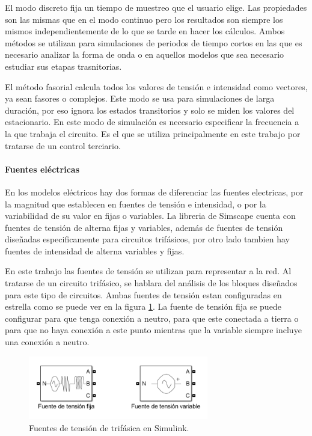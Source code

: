 \documentclass{book}
\begin{document}
El modo discreto fija un tiempo de muestreo que el usuario elige. Las propiedades son las mismas que en el modo continuo pero los resultados son siempre los mismos independientemente de lo que se tarde en hacer los c\'alculos. Ambos m\'etodos se utilizan para simulaciones de periodos de tiempo cortos en las que es necesario analizar la forma de onda o en aquellos modelos que sea necesario estudiar sus etapas trasnitorias. \par

El m\'etodo fasorial calcula todos los valores de tensi\'on e intensidad como vectores, ya sean fasores o complejos. Este modo se usa para simulaciones de larga duraci\'on, por eso ignora los estados transitorios y solo se miden los valores del estacionario. En este modo de simulaci\'on es necesario especificar la frecuencia a la que trabaja el circuito. Es el que se utiliza principalmente en este trabajo por tratarse de un control terciario. \par

		\paragraph {Fuentes el\'ectricas}
En los modelos el\'ectricos hay dos formas de diferenciar las fuentes electricas, por la magnitud que establecen en fuentes de tensi\'on e intensidad, o por la variabilidad de su valor en fijas o variables. La libreria de Simscape cuenta con fuentes de tensi\'on de alterna fijas y variables, además de fuentes de tensi\'on diseñadas especificamente para circuitos trif\'asicos, por otro lado tambien hay fuentes de intensidad de alterna variables y fijas. \par

En este trabajo las fuentes de tensi\'on se utilizan para representar a la red. Al tratarse de un circuito trif\'asico, se hablara del an\'alisis de los bloques diseñados para este tipo de circuitos. Ambas fuentes de tensi\'on estan configuradas en estrella como se puede ver en la figura \ref{VoltageSources}. La fuente de tensi\'on fija se puede configurar para que tenga conexi\'on a neutro, para que este conectada a tierra o para que no haya conexi\'on a este punto mientras que la variable siempre incluye una conexi\'on a neutro. \par

\begin{figure}[h!]
\centering
\includegraphics[width=0.7\textwidth]{VoltageSources.PNG}
\caption{Fuentes de tensi\'on de trif\'asica en Simulink. }
\label{VoltageSources}
\end{figure} \par
\end{document}
